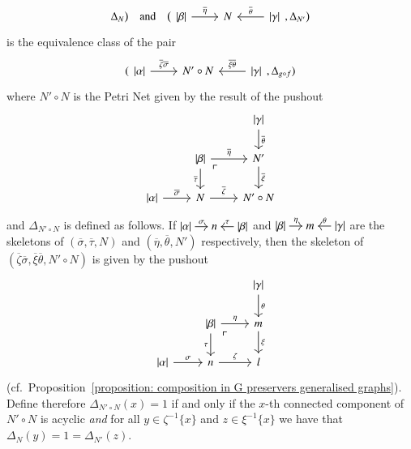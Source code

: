 \begin{definition}
\begin{itemize}[leftmargin=*]
\[        \Delta_N  \bigr)
        \quad \text{and} \quad
        \bigl(
        \begin{tikzcd}
        \length\beta \ar[r,"\overline\eta"] & N & \ar[l,"\overline\theta"'] \length\gamma
        \end{tikzcd},
        \Delta_{N'}  \bigr)
        \]
        is the equivalence class of the pair
        \[
        (
        \begin{tikzcd}
        \length\alpha \ar[r,"\overline\zeta \overline\sigma"] & {N'} \circ N & \ar[l,"\overline\xi \overline\theta"'] \length\gamma
        \end{tikzcd},
        \Delta_{g \circ f}
        )
        \]
        where $N' \circ N$ is the Petri Net given by the result of the pushout
        \[
        \begin{tikzcd}
        & & \length\gamma \ar[d,"\overline\theta"] \\
        & \length\beta \ar[d,"\overline\tau"'] \ar[r,"\overline\eta"] \ar[dr, phantom, "\ulcorner" very near start] & N' \ar[d,"\overline\xi"] \\
        \length\alpha \ar[r,"\overline\sigma"] & N \ar[r,"\overline\zeta"] & N' \circ N
        \end{tikzcd}
        \] 
        and $\Delta_{N' \circ N}$ is defined as follows. If
        $
        \begin{tikzcd}[cramped,sep=small]
        \length\alpha \ar[r,"\sigma"] & n & \length\beta \ar[l,"\tau"']
        \end{tikzcd}
        $
        and 
        $
        \begin{tikzcd}[cramped,sep=small]
        \length\beta \ar[r,"\eta"] & m & \length\gamma \ar[l,"\theta"']
        \end{tikzcd}
        $
        are the skeletons of $(\overline\sigma,\overline\tau,N)$ and $(\overline\eta,\overline\theta,N')$ respectively, then the skeleton of $(\overline\zeta\overline\sigma,\overline\xi\overline\theta,N'\circ N)$ is given by the pushout 
        \[
        \begin{tikzcd}
        & & \length\gamma \ar[d,"\theta"] \\
        & \length\beta \ar[d,"\tau"'] \ar[r,"\eta"] \ar[dr, phantom, "\ulcorner" very near start] & m \ar[d,"\xi"] \\
        \length\alpha \ar[r,"\sigma"] & n \ar[r,"\zeta"] & l
        \end{tikzcd}
        \]
        (cf.\ Proposition~\ref{proposition: composition in G preservers generalised graphs}). Define therefore $\Delta_{N' \circ N}(x)=1$ if and only if the $x$-th connected component of $N'\circ N$ is acyclic \emph{and} for all $y \in \zeta^{-1}\{x\}$ and $z \in \xi^{-1}\{x\}$ we have that $\Delta_N(y) = 1 = \Delta_{N'}(z)$.
    \end{itemize}
\end{definition}

